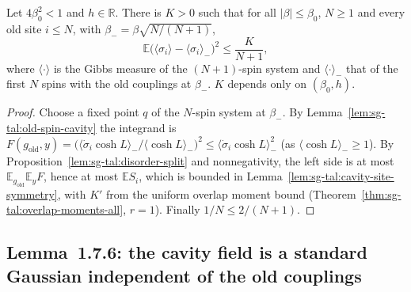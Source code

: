 \begin{theorem}[Lemma~1.7.4, Eq.~(1.186)]
\label{thm:sg-tal:lemma-174-b}
  \leanok
{}
Let $4\beta_0^2<1$ and $h\in\mathbb R$.  There is $K>0$ such that for all $|\beta|\le\beta_0$, $N\ge1$ and every old site $i\le N$, with $\beta_-=\beta\sqrt{N/(N+1)}$,
\[
\mathbb E\bigl(\langle\sigma_i\rangle-\langle\sigma_i\rangle_-\bigr)^2\le\frac K{N+1},
\]
where $\langle\cdot\rangle$ is the Gibbs measure of the $(N+1)$-spin system and $\langle\cdot\rangle_-$ that of the first $N$ spins with the old couplings at $\beta_-$.  $K$ depends only on $(\beta_0,h)$.
\end{theorem}
\begin{proof}
  \leanok
Choose a fixed point $q$ of the $N$-spin system at $\beta_-$.  By Lemma~\ref{lem:sg-tal:old-spin-cavity} the integrand is $F(g_{\mathrm{old}},y)=\bigl(\langle\dot\sigma_i\cosh L\rangle_-/\langle\cosh L\rangle_-\bigr)^2\le\langle\dot\sigma_i\cosh L\rangle_-^2$ (as $\langle\cosh L\rangle_-\ge1$).  By Proposition~\ref{lem:sg-tal:disorder-split} and nonnegativity, the left side is at most $\mathbb E_{g_{\mathrm{old}}}\mathbb E_yF$, hence at most $\mathbb E S_i$, which is bounded in Lemma~\ref{lem:sg-tal:cavity-site-symmetry}, with $K'$ from the uniform overlap moment bound (Theorem~\ref{thm:sg-tal:overlap-moments-all}, $r=1$).  Finally $1/N\le2/(N+1)$.
\end{proof}

\subsection{Lemma~1.7.6: the cavity field is a standard Gaussian independent of the old couplings}
\label{sec:sg-tal:fluct-gaussian-field}

